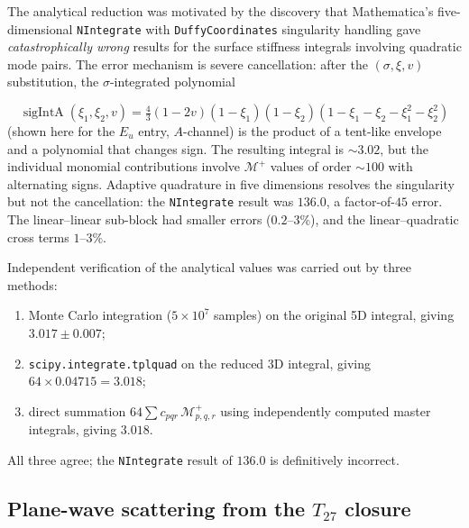 \begin{remark}
\label{rem:ninteg-failure}
{\sloppy
The analytical reduction was motivated by the discovery that
Mathematica's five-dimensional \texttt{NIntegrate} with
\texttt{DuffyCoordinates} singularity handling gave
\emph{catastrophically wrong} results for the surface stiffness
integrals involving quadratic mode pairs.  The error mechanism is
severe cancellation: after the $(\sigma,\xi,v)$ substitution, the
$\sigma$-integrated polynomial\par}
\begin{equation*}
  \operatorname{sigIntA}(\xi_1,\xi_2,v)
  = \tfrac{4}{3}(1-2v)(1-\xi_1)(1-\xi_2)
    (1-\xi_1-\xi_2-\xi_1^2-\xi_2^2)
\end{equation*}
(shown here for the $E_u$ entry, $A$-channel) is the product of a
tent-like envelope and a polynomial that changes sign.  The resulting
integral is $\sim\!3.02$, but the individual monomial contributions
involve $\mathcal{M}^+$ values of order $\sim\!100$ with alternating
signs.  Adaptive quadrature in five dimensions resolves the singularity
but not the cancellation: the \texttt{NIntegrate} result was $136.0$,
a factor-of-$45$ error.  The linear--linear sub-block had smaller
errors ($0.2$--$3\%$), and the linear--quadratic cross terms $1$--$3\%$.

Independent verification of the analytical values was carried out by
three methods:
\begin{enumerate}[label=(\roman*)]
  \item Monte Carlo integration ($5 \times 10^7$ samples) on the
    original 5D integral, giving $3.017 \pm 0.007$;
  \item \texttt{scipy.integrate.tplquad} on the reduced 3D integral,
    giving $64 \times 0.04715 = 3.018$;
  \item direct summation $64\sum c_{pqr}\,\mathcal{M}^+_{p,q,r}$ using
    independently computed master integrals, giving $3.018$.
\end{enumerate}
All three agree; the \texttt{NIntegrate} result of $136.0$ is
definitively incorrect.
\end{remark}

\subsection{Plane-wave scattering from the \texorpdfstring{$T_{27}$}{T27}
closure}
\label{sec:plane-wave}

